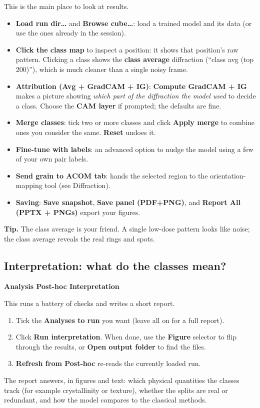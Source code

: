 \documentclass[11pt]{article}
\newcommand{\btn}[1]{\textbf{#1}}
\newcommand{\tab}[1]{\textsf{\textbf{#1}}}
\newcommand{\tip}[1]{\par\smallskip\noindent\colorbox{tipc}{\parbox{\dimexpr\linewidth-2\fboxsep}{\textbf{Tip.} #1}}\par\smallskip}
\begin{document}
This is the main place to look at results.
\begin{itemize}[itemsep=3pt]
\item \btn{Load run dir\dots} and \btn{Browse cube\dots}: load a trained model and
its data (or use the ones already in the session).
\item \textbf{Click the class map} to inspect a position: it shows that position's
raw pattern. Clicking a class shows the \textbf{class average} diffraction
(``class avg (top 200)''), which is much cleaner than a single noisy frame.
\item \textbf{Attribution (Avg + GradCAM + IG)}: \btn{Compute GradCAM + IG} makes a
picture showing \emph{which part of the diffraction the model used} to decide a
class. Choose the \textbf{CAM layer} if prompted; the defaults are fine.
\item \textbf{Merge classes}: tick two or more classes and click \btn{Apply merge}
to combine ones you consider the same. \btn{Reset} undoes it.
\item \textbf{Fine-tune with labels}: an advanced option to nudge the model using a
few of your own pair labels.
\item \btn{Send grain to ACOM tab}: hands the selected region to the orientation-
mapping tool (see Diffraction).
\item \textbf{Saving}: \btn{Save snapshot}, \btn{Save panel (PDF+PNG)}, and
\btn{Report All (PPTX + PNGs)} export your figures.
\end{itemize}
\tip{The class average is your friend. A single low-dose pattern looks like noise;
the class average reveals the real rings and spots.}

\subsection{Interpretation: what do the classes mean?}
\tab{Analysis \textrightarrow{} Post-hoc \textrightarrow{} Interpretation}

This runs a battery of checks and writes a short report.
\begin{enumerate}[itemsep=2pt]
\item Tick the \textbf{Analyses to run} you want (leave all on for a full report).
\item Click \btn{Run interpretation}. When done, use the \textbf{Figure} selector
to flip through the results, or \btn{Open output folder} to find the files.
\item \btn{Refresh from Post-hoc} re-reads the currently loaded run.
\end{enumerate}
The report answers, in figures and text: which physical quantities the classes
track (for example crystallinity or texture), whether the splits are real or
redundant, and how the model compares to the classical methods.
\end{document}

